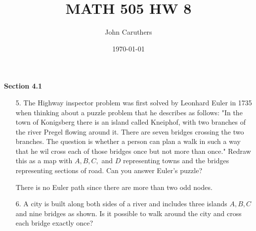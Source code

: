 \documentclass{article}
\title{MATH 505 HW 8}
\author{John Caruthers}
\date\today
\begin{document}
\maketitle

\textbf{Section 4.1}

\begin{itemize}
    
    \item[5.] The Highway inspector problem was first solved by Leonhard Euler in 1735 when thinking about a puzzle problem that he describes as follows: "In the town of Konigsberg there is an island called Kneiphof, with two branches of the river Pregel flowing around it.  There are seven bridges crossing the two branches.  The question is whether a person can plan a walk in such a way that he wil cross each of those bridges once but not more than once." Redraw this as a map with $A, B, C,$ and $D$ representing towns and the bridges representing sections of road. Can you answer Euler's puzzle?
    
    \begin{center}
    \end{center}
    
    {\color{blue} There is no Euler path since there are more than two odd nodes.}
    
    \item[6.] A city is built along both sides of a river and includes three islands $A, B, C$ and nine bridges as shown.  Is it possible to walk around the city and cross each bridge exactly once?
    
    \begin{center}
\end{center}
\end{itemize}
\end{document}
